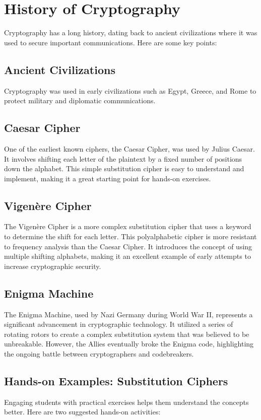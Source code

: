 \chapter{History of Cryptography}

Cryptography has a long history, dating back to ancient civilizations where it was used to secure important communications. Here are some key points:

\section*{Ancient Civilizations}
Cryptography was used in early civilizations such as Egypt, Greece, and Rome to protect military and diplomatic communications.

\section*{Caesar Cipher}
One of the earliest known ciphers, the Caesar Cipher, was used by Julius Caesar. It involves shifting each letter of the plaintext by a fixed number of positions down the alphabet. This simple substitution cipher is easy to understand and implement, making it a great starting point for hands-on exercises.

\section*{Vigenère Cipher}
The Vigenère Cipher is a more complex substitution cipher that uses a keyword to determine the shift for each letter. This polyalphabetic cipher is more resistant to frequency analysis than the Caesar Cipher. It introduces the concept of using multiple shifting alphabets, making it an excellent example of early attempts to increase cryptographic security.

\section*{Enigma Machine}
The Enigma Machine, used by Nazi Germany during World War II, represents a significant advancement in cryptographic technology. It utilized a series of rotating rotors to create a complex substitution system that was believed to be unbreakable. However, the Allies eventually broke the Enigma code, highlighting the ongoing battle between cryptographers and codebreakers.

\section*{Hands-on Examples: Substitution Ciphers}
Engaging students with practical exercises helps them understand the concepts better. Here are two suggested hands-on activities:

